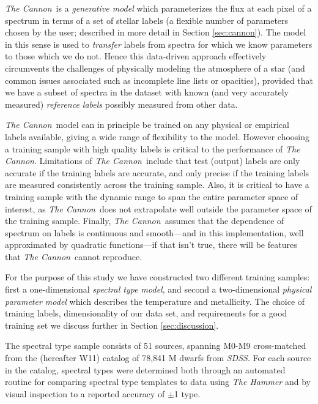 \documentclass[modern]{aastex62}
\newcommand{\thecannon}{\textsl{The Cannon}}
\newcommand{\sdss}{\textsl{SDSS}}
\begin{document}
\thecannon\ is a \emph{generative model} which parameterizes the flux at each pixel of a spectrum in terms of a set of stellar labels (a flexible number of parameters chosen by the user; described in more detail in Section \ref{sec:cannon}). The model in this sense is used to \emph{transfer} labels from spectra for which we know parameters to those which we do not. Hence this data-driven approach effectively circumvents the challenges of physically modeling the atmosphere of a star (and common issues associated such as incomplete line lists or opacities), provided that we have a subset of spectra in the dataset with known (and very accurately measured) \emph{reference labels} possibly measured from other data. 

\thecannon\ model can in principle be trained on any physical or empirical labels available, giving a wide range of flexibility to the model. However choosing a training sample with high quality labels is critical to the performance of \thecannon.
Limitations of \thecannon\ include that test (output) labels are only accurate if the training labels are accurate, and only precise if the training labels are measured consistently across the training sample.
Also, it is critical to have a training sample with the dynamic range to span the entire parameter space of interest, as \thecannon\ does not extrapolate well outside the parameter space of the training sample.
Finally, \thecannon\ assumes that the dependence of spectrum on labels is continuous and smooth---and in this implementation, well approximated by quadratic functions---if that isn't true, there will be features that \thecannon\ cannot reproduce.

For the purpose of this study we have constructed two different training samples: first a one-dimensional \emph{spectral type model}, and second a two-dimensional \emph{physical parameter model} which describes the temperature and metallicity. The choice of training labels, dimensionality of our data set, and requirements for a good training set we discuss further in Section \ref{sec:discussion}.

The spectral type sample consists of 51 sources, spanning M0-M9 cross-matched from the \citealt{West:2011} (hereafter W11) catalog of 78,841 M dwarfs from \sdss. For each source in the catalog, spectral types were determined both through an automated routine for comparing spectral type templates to data using \textsl{The Hammer} \citep{Covey:2007} and by visual inspection to a reported accuracy of $\pm$1 type.
\end{document}
